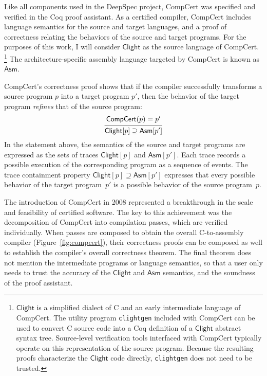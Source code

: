 \documentclass[11pt,oneside]{book}
\theoremstyle{definition}
\newcommand{\kw}[1]{\ensuremath{ \mathsf{#1} }}
\begin{document}
Like all components used in the DeepSpec project,
CompCert was specified and verified
in the Coq proof assistant.
As a certified compiler,
CompCert includes
language semantics for the source and target languages,
and a proof of correctness relating the behaviors of
the source and target programs.
For the purposes of this work,
I will consider \kw{Clight}
as the source language of CompCert.%
\footnote{%
\kw{Clight} is a simplified dialect of C
and an early intermediate language of CompCert.
The utility program \texttt{clightgen} included with CompCert
can be used to convert C source code into
a Coq definition of a \kw{Clight} abstract syntax tree.
Source-level verification tools interfaced with CompCert
typically operate on this representation of the source program.
Because the resulting proofs characterize
the \kw{Clight} code directly,
\texttt{clightgen} does not need to be trusted.
}
The architecture-specific assembly language
targeted by CompCert is known as \kw{Asm}.

CompCert's correctness proof
shows that if the compiler successfully transforms
a source program $p$ into a target program $p'$,
then the behavior of the target program
\emph{refines} that of the source program:
\[
  \begin{prooftree}
    \hypo{\kw{CompCert}(p) = p'}
    \infer1{\kw{Clight}[p] \supseteq \kw{Asm}[p']}
  \end{prooftree}
\]
In the statement above,
the semantics of the source and target programs
are expressed as the sets of traces
$\kw{Clight}[p]$ and $\kw{Asm}[p']$.
Each trace records a possible execution of the corresponding program
as a sequence of events.
The trace containment property
$\kw{Clight}[p] \supseteq \kw{Asm}[p']$
expresses that every possible behavior of
the target program~$p'$
is a possible behavior of the source program~$p$.

The introduction of CompCert in 2008
represented a breakthrough
in the scale and feasibility of
certified software.
The key to this achievement
was the decomposition of CompCert
into compilation passes,
which are verified individually.
When passes are composed to obtain the overall
C-to-assembly compiler
(Figure~\ref{fig:compcert}),
their correctness proofs can be composed as well
to establish the compiler's overall correctness theorem.
The final theorem does not mention the intermediate
programs or language semantics,
so that a user only needs to trust
the accuracy of the \kw{Clight} and \kw{Asm} semantics,
and the soundness of the proof assistant.
\end{document}
